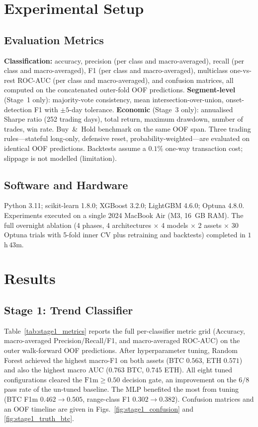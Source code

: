 \documentclass[conference]{IEEEtran}
\begin{document}
\section{Experimental Setup}

\subsection{Evaluation Metrics}
\textbf{Classification:} accuracy, precision (per class and macro-averaged), recall (per class and macro-averaged), F1 (per class and macro-averaged), multiclass one-vs-rest ROC-AUC (per class and macro-averaged), and confusion matrices, all computed on the concatenated outer-fold OOF predictions. \textbf{Segment-level} (Stage~1 only): majority-vote consistency, mean intersection-over-union, onset-detection F1 with $\pm 5$-day tolerance. \textbf{Economic} (Stage~3 only): annualised Sharpe ratio (252 trading days), total return, maximum drawdown, number of trades, win rate. Buy~\&~Hold benchmark on the same OOF span. Three trading rules---stateful long-only, defensive reset, probability-weighted---are evaluated on identical OOF predictions. Backtests assume a $0.1\%$ one-way transaction cost; slippage is not modelled (limitation).

\subsection{Software and Hardware}
Python 3.11; scikit-learn 1.8.0; XGBoost 3.2.0; LightGBM 4.6.0; Optuna 4.8.0. Experiments executed on a single 2024 MacBook Air (M3, 16~GB RAM). The full overnight ablation (4 phases, 4 architectures $\times$ 4 models $\times$ 2 assets $\times$ 30 Optuna trials with 5-fold inner CV plus retraining and backtests) completed in $1$h\,$43$m.

\section{Results}

\subsection{Stage 1: Trend Classifier}
Table~\ref{tab:stage1_metrics} reports the full per-classifier metric grid (Accuracy, macro-averaged Precision/Recall/F1, and macro-averaged ROC-AUC) on the outer walk-forward OOF predictions. After hyperparameter tuning, Random Forest achieved the highest macro-F1 on both assets (BTC $0.563$, ETH $0.571$) and also the highest macro AUC ($0.763$ BTC, $0.745$ ETH). All eight tuned configurations cleared the $\text{F1m}\geq 0.50$ decision gate, an improvement on the $6/8$ pass rate of the un-tuned baseline. The MLP benefited the most from tuning (BTC F1m $0.462\to 0.505$, range-class F1 $0.302\to 0.382$). Confusion matrices and an OOF timeline are given in Figs.~\ref{fig:stage1_confusion} and \ref{fig:stage1_truth_btc}.
\end{document}
